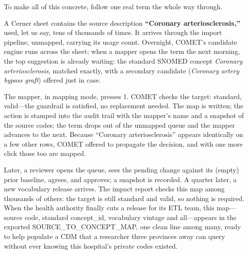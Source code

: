 \documentclass[12pt,openany]{book}
\newcommand{\code}[1]{{\ttfamily\small #1}}
\begin{document}
To make all of this concrete, follow one real term the whole way through.

A Cerner sheet contains the source description \textbf{``Coronary arteriosclerosis,''} used, let us
say, tens of thousands of times. It arrives through the import pipeline, unmapped, carrying its usage
count. Overnight, COMET's candidate engine runs across the sheet; when a mapper opens the term the
next morning, the top suggestion is already waiting: the standard SNOMED concept \emph{Coronary
arteriosclerosis}, matched exactly, with a secondary candidate (\emph{Coronary artery bypass graft})
offered just in case.

The mapper, in mapping mode, presses \code{1}. COMET checks the target: standard, valid---the guardrail
is satisfied, no replacement needed. The map is written; the action is stamped into the audit trail
with the mapper's name and a snapshot of the source codes; the term drops out of the unmapped queue
and the mapper advances to the next. Because ``Coronary arteriosclerosis'' appears identically on a few
other rows, COMET offered to propagate the decision, and with one more click those too are mapped.

Later, a reviewer opens the queue, sees the pending change against its (empty) prior baseline, agrees,
and approves; a snapshot is recorded. A quarter later, a new vocabulary release arrives. The impact
report checks this map among thousands of others: the target is still standard and valid, so nothing
is required. When the health authority finally cuts a release for its ETL team, this map---source
code, standard \code{concept\_id}, vocabulary vintage and all---appears in the exported
SOURCE\_TO\_CONCEPT\_MAP, one clean line among many, ready to help populate a CDM that a researcher
three provinces away can query without ever knowing this hospital's private codes existed.

\begin{center}
\end{center}
\end{document}
